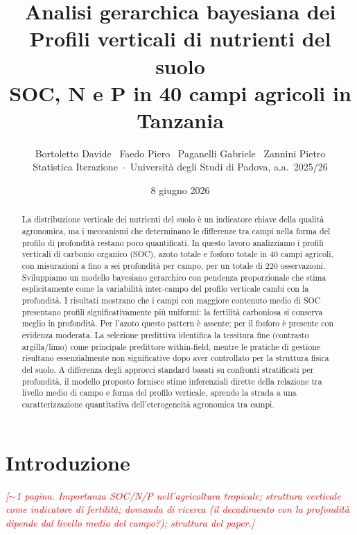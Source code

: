 \documentclass[11pt, a4paper]{article}
\title{%
  {\Large Analisi gerarchica bayesiana dei}\\[4pt]
  {\huge\bfseries Profili verticali di nutrienti del suolo}\\[4pt]
  {\large\bfseries SOC, N e P in 40 campi agricoli in Tanzania}
}
\author{
  Bortoletto Davide \, Faedo Piero \, Paganelli Gabriele \, Zannini Pietro \\[4pt]
  {\small Statistica Iterazione \,$\cdot$\, Universit\`a degli Studi di Padova, a.a.~2025/26}
}
\date{8 giugno 2026}
\newcommand{\todo}[1]{\textcolor{red}{\textit{[#1]}}}
\begin{document}
\renewcommand{\abstractname}{Abstract}
\maketitle
\thispagestyle{empty}

\begin{abstract}
\noindent
La distribuzione verticale dei nutrienti del suolo è un indicatore chiave della qualità agronomica, ma i meccanismi che determinano le differenze tra campi nella forma del profilo di profondità restano poco quantificati. In questo lavoro analizziamo i profili verticali di carbonio organico (SOC), azoto totale e fosforo totale in 40 campi agricoli, con misurazioni a fino a sei profondità per campo, per un totale di 220 osservazioni. Sviluppiamo un modello bayesiano gerarchico con pendenza proporzionale che stima esplicitamente come la variabilità inter-campo del profilo verticale cambi con la profondità. I risultati mostrano che i campi con maggiore contenuto medio di SOC presentano profili significativamente più uniformi: la fertilità carboniosa si conserva meglio in profondità. Per l'azoto questo pattern è assente; per il fosforo è presente con evidenza moderata. La selezione predittiva identifica la tessitura fine (contrasto argilla/limo) come principale predittore within-field, mentre le pratiche di gestione risultano essenzialmente non significative dopo aver controllato per la struttura fisica del suolo. A differenza degli approcci standard basati su confronti stratificati per profondità, il modello proposto fornisce stime inferenziali dirette della relazione tra livello medio di campo e forma del profilo verticale, aprendo la strada a una caratterizzazione quantitativa dell'eterogeneità agronomica tra campi.
\end{abstract}

\newpage
\tableofcontents
\newpage


\section{Introduzione}
\label{sec:intro}

\todo{$\sim$1 pagina. Importanza SOC/N/P nell'agricoltura tropicale;
struttura verticale come indicatore di fertilit\`a; domanda di ricerca
(il decadimento con la profondit\`a dipende dal livello medio del campo?);
struttura del paper.}
\end{document}
